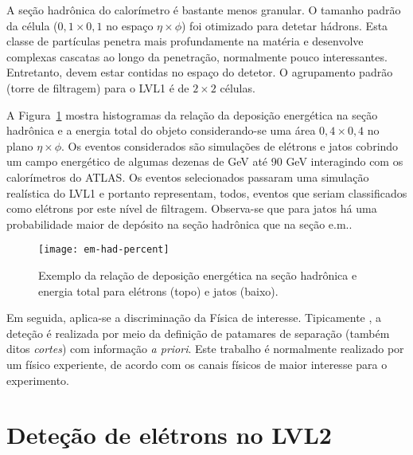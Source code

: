 A seção hadrônica do calorímetro é bastante menos granular. O tamanho padrão
da célula ($0,1\times0,1$ no espaço $\eta\times\phi$) foi otimizado para
detetar hádrons. Esta classe de partículas penetra mais profundamente na
matéria e desenvolve complexas cascatas ao longo da penetração, normalmente
pouco interessantes. Entretanto, devem estar contidas no espaço do detetor. O
agrupamento padrão (torre de filtragem) para o LVL1 é de $2\times2$ células.

A Figura~\ref{fig:e-jet-deposit} mostra histogramas da relação da deposição
energética na seção hadrônica e a energia total do objeto considerando-se uma
área $0,4\times0,4$ no plano $\eta\times\phi$. Os eventos considerados são
simulações de elétrons e jatos cobrindo um campo energético de algumas dezenas
de GeV até 90 GeV interagindo com os calorímetros do ATLAS. Os eventos
selecionados passaram uma simulação realística do LVL1 e portanto representam,
todos, eventos que seriam classificados como elétrons por este nível de
filtragem. Observa-se que para jatos há uma probabilidade maior de depósito na
seção hadrônica que na seção e.m..

\begin{figure}
\begin{center}
\texttt{[image: em-had-percent]}
\end{center}
\caption{Exemplo da relação de deposição energética na seção hadrônica e
energia total para elétrons (topo) e jatos (baixo).}
\label{fig:e-jet-deposit}
\end{figure}

Em seguida, aplica-se a discriminação da Física de interesse. Tipicamente
\cite{nevski-calor-1992, guida-calor-1992, palutan-calor-2000}, a deteção é
realizada por meio da definição de patamares de separação (também ditos
\emph{cortes}) com informação \emph{a priori}. Este trabalho é normalmente
realizado por um físico experiente, de acordo com os canais físicos de maior
interesse para o experimento.


\section{Deteção de elétrons no LVL2}
\label{sec:lvl2-detect-electron}

